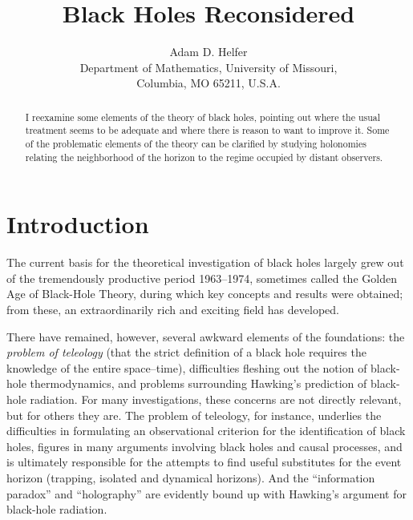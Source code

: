 \documentclass[12pt]{article}
\begin{document}
\title{Black Holes Reconsidered}

\author{Adam D. Helfer\\
  Department of Mathematics, University of Missouri, \\
  Columbia, MO 65211, U.S.A.\\
}

\maketitle

\begin{abstract}
I reexamine some elements of the theory of black holes, pointing out where the usual treatment seems to be adequate and where there is reason to want to improve it.  Some of the problematic elements of the theory can be clarified by studying holonomies relating the neighborhood of the horizon to the regime occupied by distant observers.
\end{abstract}

\newpage

\section{Introduction}

The current basis for the theoretical investigation of black holes largely grew out of the tremendously productive period 1963--1974, sometimes called the Golden Age of Black-Hole Theory, during which key concepts and results were obtained; from these, an extraordinarily rich and exciting
field has developed.

There have remained, however, several awkward elements of the foundations:  the {\em problem of teleology} (that the strict definition of a  black hole requires the knowledge of the entire
 space--time), difficulties fleshing out the notion of black-hole thermodynamics, and problems surrounding Hawking's prediction of black-hole radiation.  For many investigations, these concerns are not directly relevant, but for others they are.  
The problem of teleology, for instance, underlies the difficulties in formulating an observational criterion for the identification of black holes, figures in many arguments involving black holes and causal processes, and is ultimately responsible for the
attempts to find useful substitutes for the event horizon (trapping, isolated and dynamical horizons).
And the ``information paradox'' and ``holography'' are evidently bound up with Hawking's argument for black-hole radiation. 
\end{document}

